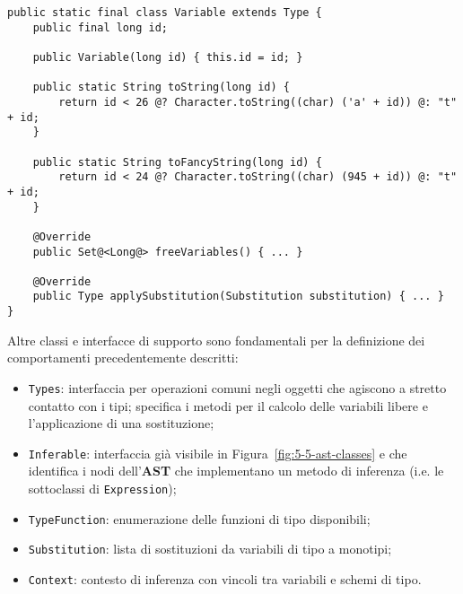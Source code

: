 \begin{lstlisting}[caption={Esempio di sottoclasse di \texttt{Type}}, style=javaCode, label={lst:5-8-hm-class-java}]
public static final class Variable extends Type {
    public final long id;
    
    public Variable(long id) { this.id = id; }

    public static String toString(long id) {
        return id < 26 @? Character.toString((char) ('a' + id)) @: "t" + id;
    }

    public static String toFancyString(long id) {
        return id < 24 @? Character.toString((char) (945 + id)) @: "t" + id;
    }

    @Override
    public Set@<Long@> freeVariables() { ... }

    @Override
    public Type applySubstitution(Substitution substitution) { ... }
}
\end{lstlisting}
\vspace{4mm}

\noindent Altre classi e interfacce di supporto sono fondamentali per la definizione dei comportamenti precedentemente descritti:
\begin{itemize}
    \item \texttt{Types}: interfaccia per operazioni comuni negli oggetti che agiscono a stretto contatto con i tipi;
          specifica i metodi per il calcolo delle variabili libere e l'applicazione di una sostituzione;
    \item \texttt{Inferable}: interfaccia già visibile in Figura~\ref{fig:5-5-ast-classes} e che identifica i nodi
          dell'\textbf{AST} che implementano un metodo di inferenza (i.e. le sottoclassi di \texttt{Expression});
    \item \texttt{TypeFunction}: enumerazione delle funzioni di tipo disponibili;
    \item \texttt{Substitution}: lista di sostituzioni da variabili di tipo a monotipi;
    \item \texttt{Context}: contesto di inferenza con vincoli tra variabili e schemi di tipo.
\end{itemize}

\newpage


